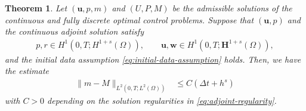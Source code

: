 \documentclass{amsart}
\newcommand{\ta}{\tau}
\newtheorem{theorem}{Theorem}[section]
\newcommand{\LRp}[1]{\left( #1 \right)}
\newcommand{\LRa}[1]{\left< #1 \right>}
\begin{document}
\begin{theorem}\label{Theorem:5.8}
	Let $(\boldsymbol{u},p,m)$ and $(U,P,M)$ be the admissible solutions of the continuous and fully discrete optimal control problems. Suppose that $(\boldsymbol{u}, p)$ and the continuous adjoint solution satisfy
	\begin{align}\label{eq:adjoint-regularity}
		p, r \in H^1(0,T; H^{1+s}(\Omega)) ,
		\qquad
		\boldsymbol{u}, \boldsymbol{w} \in H^1(0,T; \boldsymbol{H}^{1+s}(\Omega)),
	\end{align}
    and the initial data assumption \eqref{eq:initial-data-assumption} holds. 
	Then, we have the estimate 
    \begin{align*}
		\|m-M\|_{L^2(0,T;L^2(\Omega))} &\le C (\Delta t + h^s)
	\end{align*}
    with $C>0$ depending on the solution regularities in \eqref{eq:adjoint-regularity}.
\end{theorem}
\end{document}
